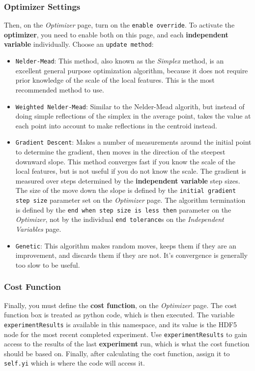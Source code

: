 \documentclass[pdftex,11pt,letterpaper]{article}
\begin{document}
\subsubsection{Optimizer Settings}
Then, on the \textit{Optimizer} page, turn on the \texttt{enable override}.  To activate the \textbf{optimizer}, you need to enable both on this page, and each \textbf{independent variable} individually.  Choose an \texttt{update method}:
\begin{itemize}
\item \texttt{Nelder-Mead}:  This method, also known as the \textit{Simplex} method, is an excellent general purpose optimization algorithm, because it does not require prior knowledge of the scale of the local features.  This is the most recommended method to use.
\item \texttt{Weighted Nelder-Mead}:  Similar to the Nelder-Mead algorith, but instead of doing simple reflections of the simplex in the average point, takes the  value at each point into account to make reflections in the centroid instead.
\item \texttt{Gradient Descent}:  Makes a number of measurements around the initial point to determine the gradient, then moves in the direction of the steepest downward slope.  This method converges fast if you know the scale of the local features, but is not useful if you do not know the scale.  The gradient is measured over steps determined by the \textbf{independent variable} step sizes.  The size of the move down the slope is defined by the \texttt{initial gradient step size} parameter set on the \textit{Optimizer} page.  The algorithm termination is defined by the \texttt{end when step size is less then} parameter on the \textit{Optimizer}, not by the individual \texttt{end tolerance}s on the \textit{Independent Variables} page.
\item \texttt{Genetic}:  This algorithm makes random moves, keeps them if they are an improvement, and discards them if they are not.  It's convergence is generally too slow to be useful.
\end{itemize}

\subsubsection{Cost Function}
Finally, you must define the \textbf{cost function}, on the \textit{Optimizer} page.  The cost function box is treated as python code, which is then executed.  The variable \texttt{experimentResults} is available in this namespace, and its value is the HDF5 node for the most recent completed experiment.  Use \texttt{experimentResults} to gain access to the results of the last \textbf{experiment} run, which is what the cost function should be based on.  Finally, after calculating the cost function, assign it to \texttt{self.yi} which is where the code will access it.
\end{document}
